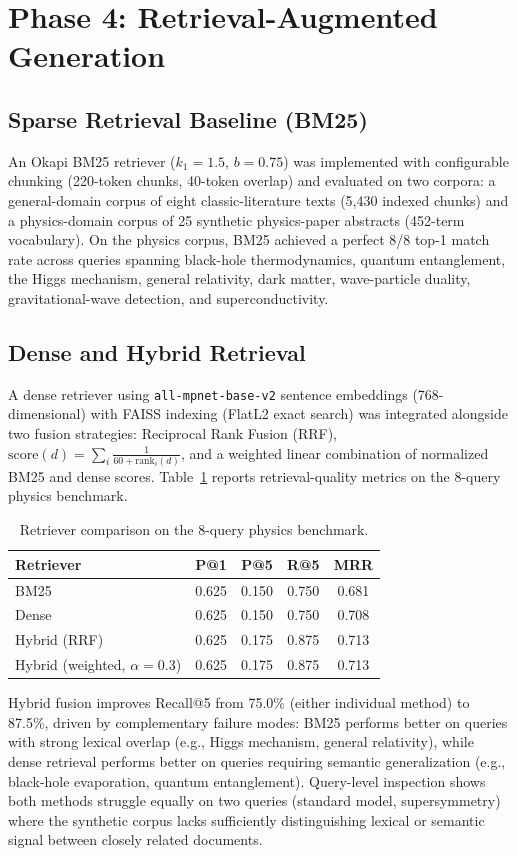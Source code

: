 \documentclass[11pt]{article}
\begin{document}
\section{Phase 4: Retrieval-Augmented Generation}
\subsection{Sparse Retrieval Baseline (BM25)}
An Okapi BM25 retriever ($k_1=1.5$, $b=0.75$) was implemented with
configurable chunking (220-token chunks, 40-token overlap) and evaluated on
two corpora: a general-domain corpus of eight classic-literature texts
(5{,}430 indexed chunks) and a physics-domain corpus of 25 synthetic
physics-paper abstracts (452-term vocabulary). On the physics corpus, BM25
achieved a perfect 8/8 top-1 match rate across queries spanning black-hole
thermodynamics, quantum entanglement, the Higgs mechanism, general
relativity, dark matter, wave-particle duality, gravitational-wave
detection, and superconductivity.

\subsection{Dense and Hybrid Retrieval}
A dense retriever using \texttt{all-mpnet-base-v2} sentence embeddings
(768-dimensional) with FAISS indexing (FlatL2 exact search) was integrated
alongside two fusion strategies: Reciprocal Rank Fusion (RRF),
$\text{score}(d) = \sum_i \frac{1}{60 + \text{rank}_i(d)}$, and a weighted
linear combination of normalized BM25 and dense scores. Table~\ref{tab:hybrid}
reports retrieval-quality metrics on the 8-query physics benchmark.

\begin{table}[h]
\centering
\caption{Retriever comparison on the 8-query physics benchmark.}
\label{tab:hybrid}
\begin{tabular}{@{}lcccc@{}}
\toprule
Retriever & P@1 & P@5 & R@5 & MRR \\
\midrule
BM25 & 0.625 & 0.150 & 0.750 & 0.681 \\
Dense & 0.625 & 0.150 & 0.750 & 0.708 \\
Hybrid (RRF) & 0.625 & 0.175 & 0.875 & 0.713 \\
Hybrid (weighted, $\alpha=0.3$) & 0.625 & 0.175 & 0.875 & 0.713 \\
\bottomrule
\end{tabular}
\end{table}

Hybrid fusion improves Recall@5 from 75.0\% (either individual method) to
87.5\%, driven by complementary failure modes: BM25 performs better on
queries with strong lexical overlap (e.g., Higgs mechanism, general
relativity), while dense retrieval performs better on queries requiring
semantic generalization (e.g., black-hole evaporation, quantum
entanglement). Query-level inspection shows both methods struggle equally
on two queries (standard model, supersymmetry) where the synthetic corpus
lacks sufficiently distinguishing lexical or semantic signal between
closely related documents.
\end{document}
